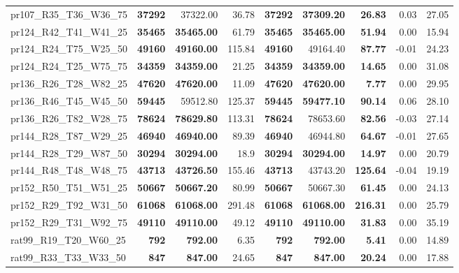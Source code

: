 \documentclass{singlecol-new}
\begin{document}
{\begin{longtable}{lrrrrrrrr}
		pr107\_R35\_T36\_W36\_75 & \textbf{37292} & 37322.00 & 36.78 & \textbf{37292} & \textbf{37309.20} & \textbf{26.83} & 0.03 & 27.05 \\
		pr124\_R42\_T41\_W41\_25 & \textbf{35465} & \textbf{35465.00} & 61.79 & \textbf{35465} & \textbf{35465.00} & \textbf{51.94} & 0.00 & 15.94 \\
		pr124\_R24\_T75\_W25\_50 & \textbf{49160} & \textbf{49160.00} & 115.84 & \textbf{49160} & 49164.40 & \textbf{87.77} & -0.01 & 24.23 \\
		pr124\_R24\_T25\_W75\_75 & \textbf{34359} & \textbf{34359.00} & 21.25 & \textbf{34359} & \textbf{34359.00} & \textbf{14.65} & 0.00 & 31.08 \\
		pr136\_R26\_T28\_W82\_25 & \textbf{47620} & \textbf{47620.00} & 11.09 & \textbf{47620} & \textbf{47620.00} & \textbf{7.77} & 0.00 & 29.95 \\
		pr136\_R46\_T45\_W45\_50 & \textbf{59445} & 59512.80 & 125.37 & \textbf{59445} & \textbf{59477.10} & \textbf{90.14} & 0.06 & 28.10 \\
		pr136\_R26\_T82\_W28\_75 & \textbf{78624} & \textbf{78629.80} & 113.31 & \textbf{78624} & 78653.60 & \textbf{82.56} & -0.03 & 27.14 \\
		pr144\_R28\_T87\_W29\_25 & \textbf{46940} & \textbf{46940.00} & 89.39 & \textbf{46940} & 46944.80 & \textbf{64.67} & -0.01 & 27.65 \\
		pr144\_R28\_T29\_W87\_50 & \textbf{30294} & \textbf{30294.00} & 18.9 & \textbf{30294} & \textbf{30294.00} & \textbf{14.97} & 0.00 & 20.79 \\
		pr144\_R48\_T48\_W48\_75 & \textbf{43713} & \textbf{43726.50} & 155.46 & \textbf{43713} & 43743.20 & \textbf{125.64} & -0.04 & 19.19 \\
		pr152\_R50\_T51\_W51\_25 & \textbf{50667} & \textbf{50667.20} & 80.99 & \textbf{50667} & 50667.30 & \textbf{61.45} & 0.00 & 24.13 \\
		pr152\_R29\_T92\_W31\_50 & \textbf{61068} & \textbf{61068.00} & 291.48 & \textbf{61068} & \textbf{61068.00} & \textbf{216.31} & 0.00 & 25.79 \\
		pr152\_R29\_T31\_W92\_75 & \textbf{49110} & \textbf{49110.00} & 49.12 & \textbf{49110} & \textbf{49110.00} & \textbf{31.83} & 0.00 & 35.19 \\
		rat99\_R19\_T20\_W60\_25 & \textbf{792} & \textbf{792.00} & 6.35 & \textbf{792} & \textbf{792.00} & \textbf{5.41} & 0.00 & 14.89 \\
		rat99\_R33\_T33\_W33\_50 & \textbf{847} & \textbf{847.00} & 24.65 & \textbf{847} & \textbf{847.00} & \textbf{20.24} & 0.00 & 17.88 \\

\end{longtable}}
\end{document}
